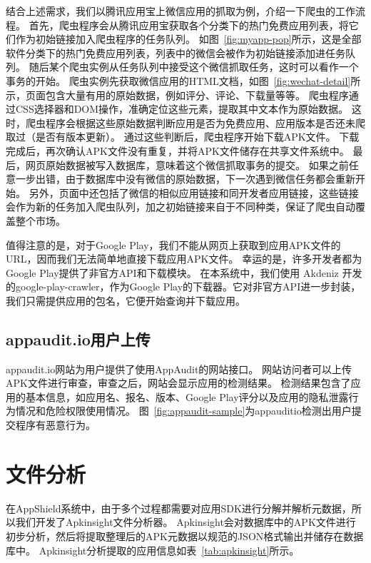 结合上述需求，我们以腾讯应用宝上微信应用的抓取为例，介绍一下爬虫的工作流程。
首先，爬虫程序会从腾讯应用宝获取各个分类下的热门免费应用列表，将它们作为初始链接加入爬虫程序的任务队列。
如图~\ref{fig:myapp-pop}所示，这是全部软件分类下的热门免费应用列表，列表中的微信会被作为初始链接添加进任务队列。
随后某个爬虫实例从任务队列中接受这个微信抓取任务，这时可以看作一个事务的开始。
爬虫实例先获取微信应用的HTML文档，如图~\ref{fig:wechat-detail}所示，页面包含大量有用的原始数据，例如评分、评论、下载量等等。
爬虫程序通过CSS选择器和DOM操作，准确定位这些元素，提取其中文本作为原始数据。
这时，爬虫程序会根据这些原始数据判断应用是否为免费应用、应用版本是否还未爬取过（是否有版本更新）。
通过这些判断后，爬虫程序开始下载APK文件。
下载完成后，再次确认APK文件没有重复，并将APK文件储存在共享文件系统中。
最后，网页原始数据被写入数据库，意味着这个微信抓取事务的提交。
如果之前任意一步出错，由于数据库中没有微信的原始数据，下一次遇到微信任务都会重新开始。
另外，页面中还包括了微信的相似应用链接和同开发者应用链接，这些链接会作为新的任务加入爬虫队列，加之初始链接来自于不同种类，保证了爬虫自动覆盖整个市场。

值得注意的是，对于Google Play，我们不能从网页上获取到应用APK文件的URL，因而我们无法简单地直接下载应用APK文件。
幸运的是，许多开发者都为Google Play提供了非官方API和下载模块。
在本系统中，我们使用 Akdeniz 开发的google-play-crawler，作为Google Play的下载器。它对非官方API进一步封装，我们只需提供应用的包名，它便开始查询并下载应用。

\subsection{appaudit.io用户上传}

appaudit.io网站为用户提供了使用AppAudit的网站接口。
网站访问者可以上传APK文件进行审查，审查之后，网站会显示应用的检测结果。
检测结果包含了应用的基本信息，如应用名、报名、版本、Google Play评分以及应用的隐私泄露行为情况和危险权限使用情况。
图~\ref{fig:appaudit-sample}为appauditio检测出用户提交程序有恶意行为。

\section{文件分析}
\label{sec:appshield:file-analyze}

在AppShield系统中，由于多个过程都需要对应用SDK进行分解并解析元数据，所以我们开发了Apkinsight文件分析器。
Apkinsight会对数据库中的APK文件进行初步分析，然后将提取整理后的APK元数据以规范的JSON格式输出并储存在数据库中。
Apkinsight分析提取的应用信息如表~\ref{tab:apkinsight}所示。


